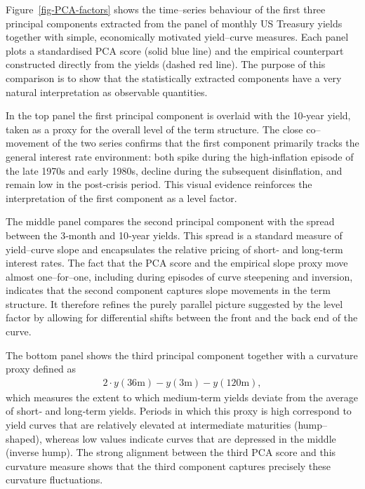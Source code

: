 \documentclass[
  letterpaper,
  DIV=11,
  numbers=noendperiod]{scrreprt}
\begin{document}
Figure~\ref{fig-PCA-factors} shows the time--series behaviour of the
first three principal components extracted from the panel of monthly US
Treasury yields together with simple, economically motivated
yield--curve measures. Each panel plots a standardised PCA score (solid
blue line) and the empirical counterpart constructed directly from the
yields (dashed red line). The purpose of this comparison is to show that
the statistically extracted components have a very natural
interpretation as observable quantities.

In the top panel the first principal component is overlaid with the
10‑year yield, taken as a proxy for the overall level of the term
structure. The close co--movement of the two series confirms that the
first component primarily tracks the general interest rate environment:
both spike during the high‑inflation episode of the late 1970s and early
1980s, decline during the subsequent disinflation, and remain low in the
post‑crisis period. This visual evidence reinforces the interpretation
of the first component as a level factor.

The middle panel compares the second principal component with the spread
between the 3‑month and 10‑year yields. This spread is a standard
measure of yield--curve slope and encapsulates the relative pricing of
short‑ and long‑term interest rates. The fact that the PCA score and the
empirical slope proxy move almost one--for--one, including during
episodes of curve steepening and inversion, indicates that the second
component captures slope movements in the term structure. It therefore
refines the purely parallel picture suggested by the level factor by
allowing for differential shifts between the front and the back end of
the curve.

The bottom panel shows the third principal component together with a
curvature proxy defined as
\begin{align}
2 \cdot y(36\text{m}) - y(3\text{m}) - y(120\text{m}), \nonumber
\end{align}
which measures the extent to which medium‑term yields deviate from the
average of short‑ and long‑term yields. Periods in which this proxy is
high correspond to yield curves that are relatively elevated at
intermediate maturities (hump--shaped), whereas low values indicate
curves that are depressed in the middle (inverse hump). The strong
alignment between the third PCA score and this curvature measure shows
that the third component captures precisely these curvature
fluctuations.
\end{document}

